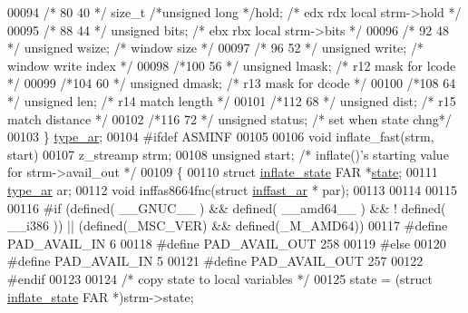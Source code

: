 \begin{DoxyCode}
{{00094 \textcolor{comment}{/* 80   40 */} \textcolor{keywordtype}{size\_t} \textcolor{comment}{/*unsigned long */}hold;       \textcolor{comment}{/* edx rdx  local strm->hold */}
00095 \textcolor{comment}{/* 88   44 */} \textcolor{keywordtype}{unsigned} bits;            \textcolor{comment}{/* ebx rbx  local strm->bits */}
00096 \textcolor{comment}{/* 92   48 */} \textcolor{keywordtype}{unsigned} wsize;           \textcolor{comment}{/*          window size */}
00097 \textcolor{comment}{/* 96   52 */} \textcolor{keywordtype}{unsigned} write;           \textcolor{comment}{/*          window write index */}
00098 \textcolor{comment}{/*100   56 */} \textcolor{keywordtype}{unsigned} lmask;           \textcolor{comment}{/*     r12  mask for lcode */}
00099 \textcolor{comment}{/*104   60 */} \textcolor{keywordtype}{unsigned} dmask;           \textcolor{comment}{/*     r13  mask for dcode */}
00100 \textcolor{comment}{/*108   64 */} \textcolor{keywordtype}{unsigned} len;             \textcolor{comment}{/*     r14  match length */}
00101 \textcolor{comment}{/*112   68 */} \textcolor{keywordtype}{unsigned} dist;            \textcolor{comment}{/*     r15  match distance */}
00102 \textcolor{comment}{/*116   72 */} \textcolor{keywordtype}{unsigned} status;          \textcolor{comment}{/*          set when state chng*/}
00103     \} \hyperlink{structinffast__ar}{type\_ar};
00104 \textcolor{preprocessor}{#ifdef ASMINF}
00105 
00106 \textcolor{keywordtype}{void} inflate\_fast(strm, start)
00107 z\_streamp strm;
00108 \textcolor{keywordtype}{unsigned} start;         \textcolor{comment}{/* inflate()'s starting value for strm->avail\_out */}
00109 \{
00110     \textcolor{keyword}{struct }\hyperlink{structinflate__state}{inflate\_state} FAR *\hyperlink{structstate}{state};
00111     \hyperlink{structinffast__ar}{type\_ar} ar;
00112     \textcolor{keywordtype}{void} inffas8664fnc(\textcolor{keyword}{struct} \hyperlink{structinffast__ar}{inffast\_ar} * par);
00113 
00114 
00115 
00116 \textcolor{preprocessor}{#if (defined( \_\_GNUC\_\_ ) && defined( \_\_amd64\_\_ ) && ! defined( \_\_i386 )) || (defined(\_MSC\_VER) &&
       defined(\_M\_AMD64))}
00117 \textcolor{preprocessor}{#define PAD\_AVAIL\_IN 6}
00118 \textcolor{preprocessor}{#define PAD\_AVAIL\_OUT 258}
00119 \textcolor{preprocessor}{#else}
00120 \textcolor{preprocessor}{#define PAD\_AVAIL\_IN 5}
00121 \textcolor{preprocessor}{#define PAD\_AVAIL\_OUT 257}
00122 \textcolor{preprocessor}{#endif}
00123 
00124     \textcolor{comment}{/* copy state to local variables */}
00125     state = (\textcolor{keyword}{struct }\hyperlink{structinflate__state}{inflate\_state} FAR *)strm->state;
}}
\end{DoxyCode}
